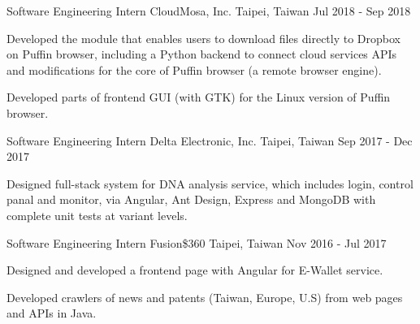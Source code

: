 \begin{cventries}
    \vspace{-2mm}


  \cventry
    {Software Engineering Intern} %
    {CloudMosa, Inc.} %
    {Taipei, Taiwan} %
    {Jul 2018 - Sep 2018} %
    {
      \begin{cvitems} %
        \item {Developed the module that enables users to download files directly to Dropbox on Puffin browser,
        including a Python backend to connect cloud services APIs and modifications for the core of Puffin browser (a remote browser engine).}
        \item {Developed parts of frontend GUI (with GTK) for the Linux version of Puffin browser.}
      \end{cvitems}
    }

    \vspace{-2mm}


  \cventry
    {Software Engineering Intern} %
    {Delta Electronic, Inc.} %
    {Taipei, Taiwan} %
    {Sep 2017 - Dec 2017} %
    {
      \begin{cvitems} %
        \item {Designed full-stack system for DNA analysis service, which includes login, control panal and monitor,
        via Angular, Ant Design, Express and MongoDB with complete unit tests at variant levels.}
      \end{cvitems}
    }

    \vspace{-2mm}


  \cventry
    {Software Engineering Intern} %
    {Fusion\$360} %
    {Taipei, Taiwan} %
    {Nov 2016 - Jul 2017} %
    {
      \begin{cvitems} %
        \item {Designed and developed a frontend page with Angular for E-Wallet service.}
        \item {Developed crawlers of news and patents (Taiwan, Europe, U.S) from web pages and APIs in Java.}
      \end{cvitems}
    }

\end{cventries}
